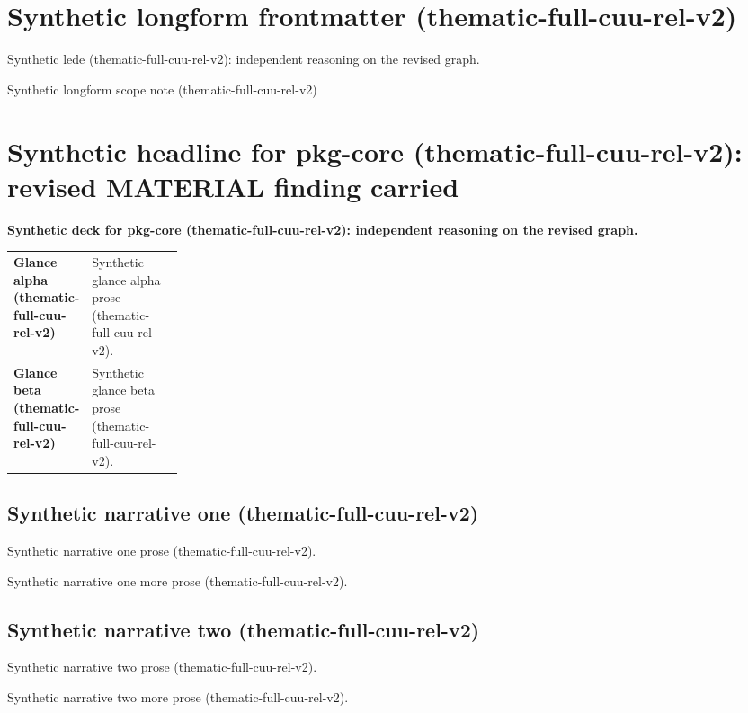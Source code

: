 \documentclass[lualatex,a4paper,10pt]{jlreq}
\begin{document}
\surveycover
\clearpage
\section*{Synthetic longform frontmatter (thematic-full-cuu-rel-v2)}
Synthetic lede (thematic-full-cuu-rel-v2): independent reasoning on the revised graph.

\begin{claimboundary}
\noindent Synthetic longform scope note (thematic-full-cuu-rel-v2)\par
\end{claimboundary}
\medskip
\tableofcontents
\clearpage
\Needspace{0.24\textheight}
\section{Synthetic headline for pkg-core (thematic-full-cuu-rel-v2): revised MATERIAL finding carried}
\label{pkg:pkg-core}
\noindent\textbf{Synthetic deck for pkg-core (thematic-full-cuu-rel-v2): independent reasoning on the revised graph.} \cite{sp001lnd001}\par\medskip
\begin{themeoverview}
\begin{tabularx}{\linewidth}{@{}>{\bfseries}p{0.22\linewidth}X@{}}
Glance alpha (thematic-full-cuu-rel-v2) & Synthetic glance alpha prose (thematic-full-cuu-rel-v2). \cite{sp001lnd001} \\
Glance beta (thematic-full-cuu-rel-v2) & Synthetic glance beta prose (thematic-full-cuu-rel-v2). \cite{sp001lnd001} \\
\end{tabularx}
\end{themeoverview}
\medskip
\begin{multicols}{2}
\subsection*{Synthetic narrative one (thematic-full-cuu-rel-v2)}
\noindent Synthetic narrative one prose (thematic-full-cuu-rel-v2). \cite{sp001lnd001}\par\medskip
\noindent Synthetic narrative one more prose (thematic-full-cuu-rel-v2). \cite{sp001lnd001}\par\medskip
\subsection*{Synthetic narrative two (thematic-full-cuu-rel-v2)}
\noindent Synthetic narrative two prose (thematic-full-cuu-rel-v2). \cite{sp001lnd001}\par\medskip
\noindent Synthetic narrative two more prose (thematic-full-cuu-rel-v2). \cite{sp001lnd001}\par\medskip
\end{multicols}
\end{document}

